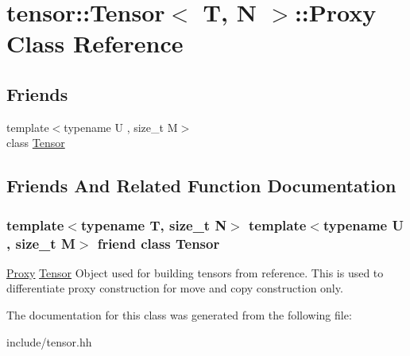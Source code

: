 \hypertarget{classtensor_1_1Tensor_1_1Proxy}{}\section{tensor\+:\+:Tensor$<$ T, N $>$\+:\+:Proxy Class Reference}
\label{classtensor_1_1Tensor_1_1Proxy}
\subsection*{Friends}
\begin{DoxyCompactItemize}
\item 
{\footnotesize template$<$typename U , size\+\_\+t M$>$ }\\class \hyperlink{classtensor_1_1Tensor_1_1Proxy_af4a07134de1525172d3c60c57e8f1496}{Tensor}
\end{DoxyCompactItemize}


\subsection{Friends And Related Function Documentation}
\subsubsection[{\texorpdfstring{Tensor}{Tensor}}]{\setlength{\rightskip}{0pt plus 5cm}template$<$typename T, size\+\_\+t N$>$ template$<$typename U , size\+\_\+t M$>$ friend class {\bf Tensor}\hspace{0.3cm}{\ttfamily [friend]}}\hypertarget{classtensor_1_1Tensor_1_1Proxy_af4a07134de1525172d3c60c57e8f1496}{}\label{classtensor_1_1Tensor_1_1Proxy_af4a07134de1525172d3c60c57e8f1496}
\hyperlink{classtensor_1_1Tensor_1_1Proxy}{Proxy} \hyperlink{classtensor_1_1Tensor}{Tensor} Object used for building tensors from reference. This is used to differentiate proxy construction for move and copy construction only. 

The documentation for this class was generated from the following file\+:\begin{DoxyCompactItemize}
\item 
include/tensor.\+hh\end{DoxyCompactItemize}

